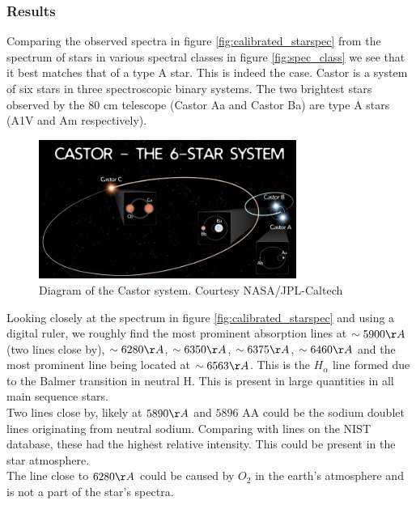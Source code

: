 \documentclass[12pt,a4paper]{article}
\begin{document}
    \subsubsection{Results}
    \label{sec:results_spectroscopy}
      Comparing the observed spectra in figure \ref{fig:calibrated_starspec} from the spectrum of stars in various spectral classes in figure \ref{fig:spec_class} we see that it best matches that of a 
      type A star. This is indeed the case. Castor is a system of six stars in three spectroscopic binary systems. The two brightest stars observed by the 80 cm telescope (Castor Aa and Castor Ba) are type A stars (A1V and Am respectively).\cite{Wikipedia_contributors_2025}\cite{Pourbaix_Tokovinin_Batten_Fekel_Hartkopf_Levato_Morrell_Torres_Udry_2004}
      \begin{figure}[H]
        \centering
        \includegraphics[width=0.75\textwidth]{Pictures/Castor.png}
        \caption{Diagram of the Castor system. Courtesy NASA/JPL-Caltech\cite{Wikipedia_contributors_2025}\cite{Castor}}
        \label{fig:comparison}
      \end{figure}

      Looking closely at the spectrum in figure \ref{fig:calibrated_starspec} and using a digital ruler, we roughly find the most prominent absorption lines at $\sim 5900 \AA$(two lines close by), $\sim 6280 \AA$, $\sim 6350 \AA$, $\sim 6375 \AA$, $\sim 6460 \AA$ and the most prominent line 
      being located at $\sim 6563 \AA$. This is the $H_\alpha$ line formed due to the Balmer transition in neutral H. This is present in large quantities in all main sequence stars.\\
      Two lines close by, likely at $5890 \AA$ and $5896$ AA could be the sodium doublet lines originating from neutral sodium. Comparing with lines on the NIST database, these had the highest relative intensity.\cite{NIST_ASD} This could be present in the star atmosphere. \\
      The line close to $6280 \AA$ could be caused by $O_2$ in the earth's atmosphere and is not a part of the star's spectra. \\
\end{document}
